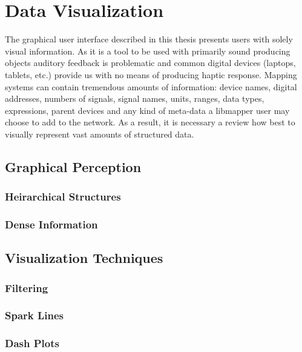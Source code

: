 \section{Data Visualization}

The graphical user interface described in this thesis presents users with solely visual information. As it is a tool to be used with primarily sound producing objects auditory feedback is problematic and common digital devices (laptops, tablets, etc.) provide us with no means of producing haptic response. Mapping systems can contain tremendous amounts of information: device names, digital addresses, numbers of signals, signal names, units, ranges, data types, expressions, parent devices and any kind of meta-data a libmapper user may choose to add to the network. As a result, it is necessary a review how best to visually represent vast amounts of structured data.

\subsection{Graphical Perception}
	\subsubsection{Heirarchical Structures}
	\subsubsection{Dense Information}
\subsection{Visualization Techniques}
	\subsubsection{Filtering}
	\subsubsection{Spark Lines}
	\subsubsection{Dash Plots}
